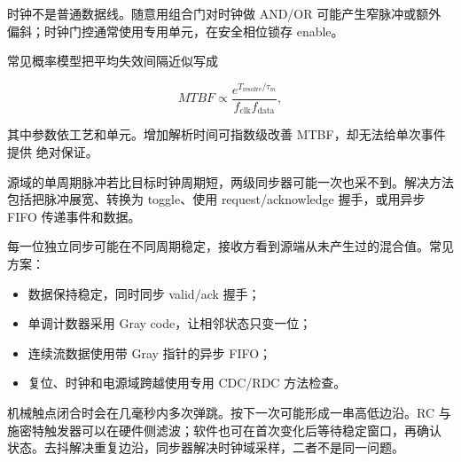 时钟不是普通数据线。随意用组合门对时钟做 AND/OR 可能产生窄脉冲或额外
偏斜；时钟门控通常使用专用单元，在安全相位锁存 enable。

\begin{center}
\end{center}

常见概率模型把平均失效间隔近似写成

\[
MTBF\propto
\frac{e^{T_{\mathrm{resolve}}/\tau_m}}
{f_{\mathrm{clk}}f_{\mathrm{data}}},
\]

其中参数依工艺和单元。增加解析时间可指数级改善 MTBF，却无法给单次事件提供
绝对保证。

源域的单周期脉冲若比目标时钟周期短，两级同步器可能一次也采不到。解决方法
包括把脉冲展宽、转换为 toggle、使用 request/acknowledge 握手，或用异步 FIFO
传递事件和数据。

每一位独立同步可能在不同周期稳定，接收方看到源端从未产生过的混合值。常见
方案：

\begin{itemize}[leftmargin=2.2em]
  \item 数据保持稳定，同时同步 valid/ack 握手；
  \item 单调计数器采用 Gray code，让相邻状态只变一位；
  \item 连续流数据使用带 Gray 指针的异步 FIFO；
  \item 复位、时钟和电源域跨越使用专用 CDC/RDC 方法检查。
\end{itemize}

机械触点闭合时会在几毫秒内多次弹跳。按下一次可能形成一串高低边沿。RC 与
施密特触发器可以在硬件侧滤波；软件也可在首次变化后等待稳定窗口，再确认
状态。去抖解决重复边沿，同步器解决时钟域采样，二者不是同一问题。

